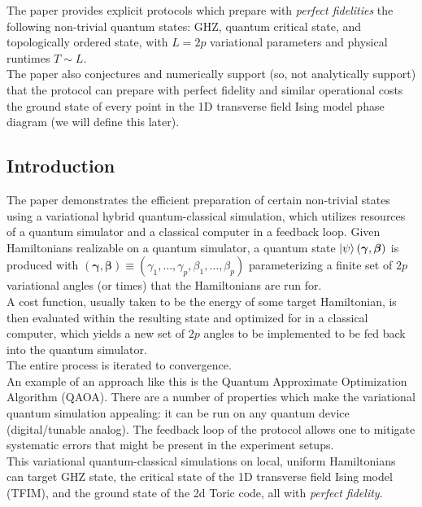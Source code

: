 \documentclass{book}
\theoremstyle{definition}
\begin{document}
The paper provides explicit protocols which prepare with \textit{perfect fidelities} the following non-trivial quantum states: GHZ, quantum critical state, and topologically ordered state, with $L=2p$ variational parameters and physical runtimes $T \sim L$. \\

The paper also conjectures and numerically support (so, not analytically support) that the protocol can prepare with perfect fidelity and similar operational costs the ground state of every point in the 1D transverse field Ising model phase diagram (we will define this later). 




\subsection{Introduction}



The paper demonstrates the efficient preparation of certain non-trivial states using a variational hybrid quantum-classical simulation, which utilizes resources of a quantum simulator and a classical computer in a feedback loop. Given Hamiltonians realizable on a quantum simulator, a quantum state $\ket{\psi}(\bm{\gamma}, \bm{\beta})$ is produced with $(\bm{\gamma}, \bm\beta) \equiv (\gamma_1,\dots,\gamma_p, \beta_1,\dots,\beta_p)$ parameterizing a finite set of $2p$ variational angles (or times) that the Hamiltonians are run for. \\

A cost function, usually taken to be the energy of some target Hamiltonian, is then evaluated within the resulting state and optimized for in a classical computer, which yields a new set of $2p$ angles to be implemented to be fed back into the quantum simulator. \\

The entire process is iterated to convergence. \\


An example of an approach like this is the Quantum Approximate Optimization Algorithm (QAOA). There are a number of properties which make the variational quantum simulation appealing: it can be run on any quantum device (digital/tunable analog). The feedback loop of the protocol allows one to mitigate systematic errors that might be present in the experiment setups. \\

This variational quantum-classical simulations on local, uniform Hamiltonians can target GHZ state, the critical state of the 1D transverse field Ising model (TFIM), and the ground state of the 2d Toric code, all with \textit{perfect fidelity}. \\
\end{document}
